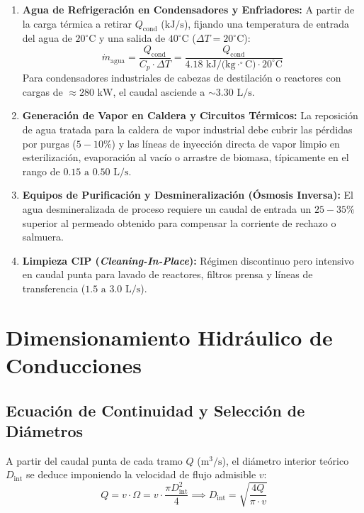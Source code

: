 \documentclass{report}
\begin{document}
\begin{enumerate}
    \item \textbf{Agua de Refrigeración en Condensadores y Enfriadores:}
          A partir de la carga térmica a retirar $Q_{\text{cond}}$ ($\text{kJ/s}$), fijando una temperatura de entrada del agua de $20^\circ\text{C}$ y una salida de $40^\circ\text{C}$ ($\Delta T = 20^\circ\text{C}$):
          \begin{equation}
              \dot{m}_{\text{agua}} = \frac{Q_{\text{cond}}}{C_p \cdot \Delta T} = \frac{Q_{\text{cond}}}{4.18\text{ kJ/(kg}\cdot^\circ\text{C)} \cdot 20^\circ\text{C}}
          \end{equation}
          Para condensadores industriales de cabezas de destilación o reactores con cargas de $\approx 280\text{ kW}$, el caudal asciende a $\sim 3.30\text{ L/s}$.
    \item \textbf{Generación de Vapor en Caldera y Circuitos Térmicos:}
          La reposición de agua tratada para la caldera de vapor industrial debe cubrir las pérdidas por purgas ($5-10\%$) y las líneas de inyección directa de vapor limpio en esterilización, evaporación al vacío o arrastre de biomasa, típicamente en el rango de $0.15\text{ a }0.50\text{ L/s}$.
    \item \textbf{Equipos de Purificación y Desmineralización (Ósmosis Inversa):}
          El agua desmineralizada de proceso requiere un caudal de entrada un $25-35\%$ superior al permeado obtenido para compensar la corriente de rechazo o salmuera.
    \item \textbf{Limpieza CIP (\textit{Cleaning-In-Place}):}
          Régimen discontinuo pero intensivo en caudal punta para lavado de reactores, filtros prensa y líneas de transferencia ($1.5\text{ a }3.0\text{ L/s}$).
\end{enumerate}

\section{Dimensionamiento Hidráulico de Conducciones}

\subsection{Ecuación de Continuidad y Selección de Diámetros}
A partir del caudal punta de cada tramo $Q$ ($\text{m}^3/\text{s}$), el diámetro interior teórico $D_{\text{int}}$ se deduce imponiendo la velocidad de flujo admisible $v$:
\begin{equation}
    Q = v \cdot \Omega = v \cdot \frac{\pi D_{\text{int}}^2}{4} \implies D_{\text{int}} = \sqrt{\frac{4 Q}{\pi \cdot v}}
\end{equation}
\end{document}
